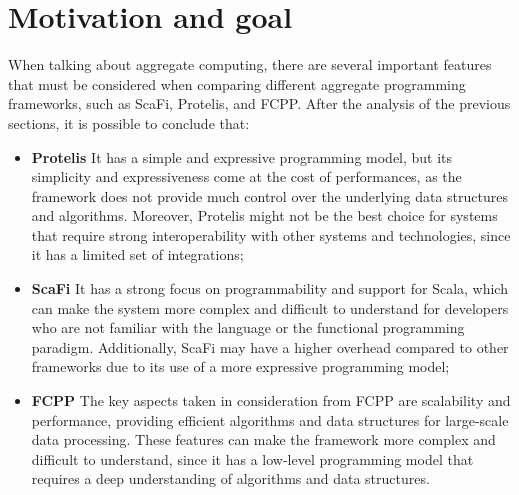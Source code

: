 \section{Motivation and goal}
When talking about aggregate computing, there are several important features that must be considered when comparing different aggregate programming frameworks, such as ScaFi, Protelis, and FCPP.\newline
After the analysis of the previous sections, it is possible to conclude that:
\begin{itemize}
    \item \textbf{Protelis}\newline
    It has a simple and expressive programming model, but its simplicity and expressiveness come at the cost of performances, as the framework does not provide much control over the underlying data structures and algorithms. Moreover, Protelis might not be the best choice for systems that require strong interoperability with other systems and technologies, since it has a limited set of integrations;
    \item \textbf{ScaFi}\newline
    It has a strong focus on programmability and support for Scala, which can make the system more complex and difficult to understand for developers who are not familiar with the language or the functional programming paradigm. Additionally, ScaFi may have a higher overhead compared to other frameworks due to its use of a more expressive programming model;
    \item \textbf{FCPP}\newline
    The key aspects taken in consideration from FCPP are scalability and performance, providing efficient algorithms and data structures for large-scale data processing. These features can make the framework more complex and difficult to understand, since it has a low-level programming model that requires a deep understanding of algorithms and data structures.
\end{itemize}

